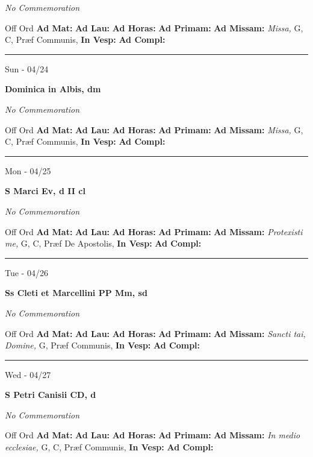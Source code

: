 \documentclass[letterpaper, 10pt]{article}
\begin{document}
\textit{No Commemoration}\begin{justify}
Off Ord
\textbf{Ad Mat: }
\textbf{Ad Lau: }
\textbf{Ad Horas: }
\textbf{Ad Primam: }
\textbf{Ad Missam:} \textit{Missa, } G, C, Præf Communis, 
\textbf{In Vesp: }
\textbf{Ad Compl: }\end{justify}



\hrule
\begin{center}
Sun - 04/24
\end{center}\textbf{ \large Dominica in Albis, \textnormal{\normalsize dm}}

\textit{No Commemoration}\begin{justify}
Off Ord
\textbf{Ad Mat: }
\textbf{Ad Lau: }
\textbf{Ad Horas: }
\textbf{Ad Primam: }
\textbf{Ad Missam:} \textit{Missa, } G, C, Præf Communis, 
\textbf{In Vesp: }
\textbf{Ad Compl: }\end{justify}



\hrule
\begin{center}
Mon - 04/25
\end{center}\textbf{ \large S Marci Ev, \textnormal{\normalsize d II cl}}

\textit{No Commemoration}\begin{justify}
Off Ord
\textbf{Ad Mat: }
\textbf{Ad Lau: }
\textbf{Ad Horas: }
\textbf{Ad Primam: }
\textbf{Ad Missam:} \textit{Protexisti me, } G, C, Præf De Apostolis, 
\textbf{In Vesp: }
\textbf{Ad Compl: }\end{justify}



\hrule
\begin{center}
Tue - 04/26
\end{center}\textbf{ \large Ss Cleti et Marcellini PP Mm, \textnormal{\normalsize sd}}

\textit{No Commemoration}\begin{justify}
Off Ord
\textbf{Ad Mat: }
\textbf{Ad Lau: }
\textbf{Ad Horas: }
\textbf{Ad Primam: }
\textbf{Ad Missam:} \textit{Sancti tai, Domine, } G, Præf Communis, 
\textbf{In Vesp: }
\textbf{Ad Compl: }\end{justify}



\hrule
\begin{center}
Wed - 04/27
\end{center}\textbf{ \large S Petri Canisii CD, \textnormal{\normalsize d}}

\textit{No Commemoration}\begin{justify}
Off Ord
\textbf{Ad Mat: }
\textbf{Ad Lau: }
\textbf{Ad Horas: }
\textbf{Ad Primam: }
\textbf{Ad Missam:} \textit{In medio ecclesiae, } G, C, Præf Communis, 
\textbf{In Vesp: }
\textbf{Ad Compl: }\end{justify}
\end{document}
